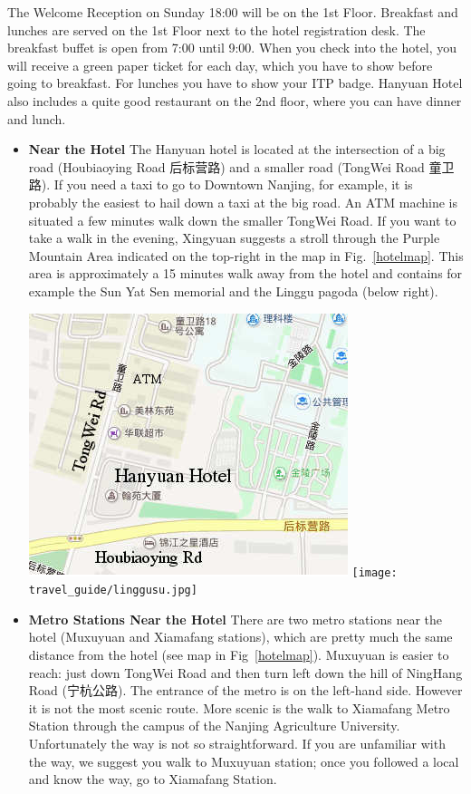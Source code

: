 \documentclass[11pt]{report}
\begin{document}
\noindent The Welcome Reception on Sunday 18:00 will be on the
1st Floor. Breakfast and lunches are served on the 1st Floor
next to the hotel registration desk. The breakfast buffet is
open from 7:00 until 9:00. When you check into the hotel, you
will receive a green paper ticket for each day, which you have
to show before going to breakfast. For lunches you have to show
your ITP badge. Hanyuan Hotel also includes a quite good
restaurant on the 2nd floor, where you can have dinner and lunch.

\begin{itemize}
\item\textbf{Near the Hotel}\hspace{3mm}
The Hanyuan hotel is located at the intersection of a big 
road
(Houbiaoying Road 后标营路) and a smaller road (TongWei Road 童卫路).
If you need a taxi to go to Downtown Nanjing, for example, it
is probably the easiest to hail down a taxi at the big road.
An ATM machine is situated a few minutes walk down the smaller
TongWei Road. If you want to take a walk in the evening,
Xingyuan suggests a stroll through the Purple Mountain Area 
indicated on
the top-right in the map in Fig.~\ref{hotelmap}. This area is
approximately a 15 minutes walk away from the hotel and
contains for example the Sun Yat Sen memorial and the Linggu
pagoda (below right).

\begin{center}
\includegraphics[scale=0.40]{travel_guide/map1a.jpg}
\hspace{5mm}
\texttt{[image: travel\_guide/linggusu.jpg]}
\end{center}

\item\textbf{Metro Stations Near the Hotel}\hspace{3mm}
There are two metro stations near the hotel (Mu\-xuyuan and
Xiamafang stations), which are pretty much the same distance
from the hotel (see map in Fig~\ref{hotelmap}). Muxuyuan is
easier to reach: just down TongWei Road and then turn left
down the hill of NingHang Road (宁杭公路). The entrance of the
metro is on the left-hand side. However it is not the most
scenic route. More scenic is the walk to Xiamafang Metro
Station through the campus of the Nanjing Agriculture
University. Unfortunately the way is not so straightforward.
If you are unfamiliar with the way, we suggest you walk to
Muxuyuan station; once you followed a local and know the
way, go to Xiamafang Station.


\end{itemize}
\end{document}
